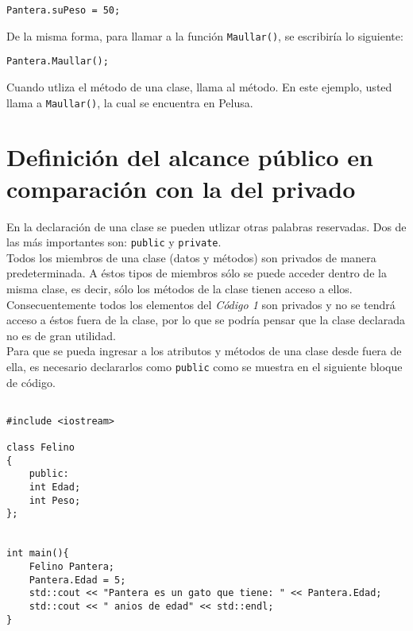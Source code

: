 \documentclass[12pt]{extarticle}
\newcommand{\<}{\langle}
\renewcommand{\>}{\rangle}
\theoremstyle{definition}
\begin{document}
\begin{lstlisting}[caption={Asignación directa a atributos de una clase},captionpos=b]
Pantera.suPeso = 50;
\end{lstlisting}

De la misma forma, para llamar a la función \verb|Maullar()|, se escribiría lo siguiente:

\begin{lstlisting}[caption={Acceso a métodos de una clase},captionpos=b]
Pantera.Maullar();
\end{lstlisting}

Cuando utliza el método de una clase, llama al método. En este ejemplo, usted llama a \verb|Maullar()|, la cual se encuentra en Pelusa.

\section{ Definición del alcance público en comparación con la del privado}
En la declaración de una clase se pueden utlizar otras palabras reservadas. Dos de las más importantes son: \verb|public| y \verb|private|.\\

Todos los miembros de una clase (datos y métodos) son privados de manera predeterminada. A éstos tipos de miembros sólo se puede acceder dentro de la misma clase, es decir, sólo los métodos de la clase tienen acceso a ellos. Consecuentemente todos los elementos del \textit{Código 1} son privados y no se tendrá acceso a éstos fuera de la clase, por lo que se podría pensar que la clase declarada no es de gran utilidad.\\

 Para que se pueda ingresar a los atributos y métodos de una clase desde fuera de ella, es necesario declararlos como \verb|public| como se muestra en el siguiente bloque de código.\\

\begin{lstlisting}[label={lst::Prog_02},caption={Uso del especificadores de acceso public },captionpos=b]

#include <iostream>

class Felino
{
	public:
	int Edad;
	int Peso;
};


int main(){
    Felino Pantera;
	Pantera.Edad = 5;
	std::cout << "Pantera es un gato que tiene: " << Pantera.Edad;
	std::cout << " anios de edad" << std::endl;
}
\end{lstlisting}
\end{document}
